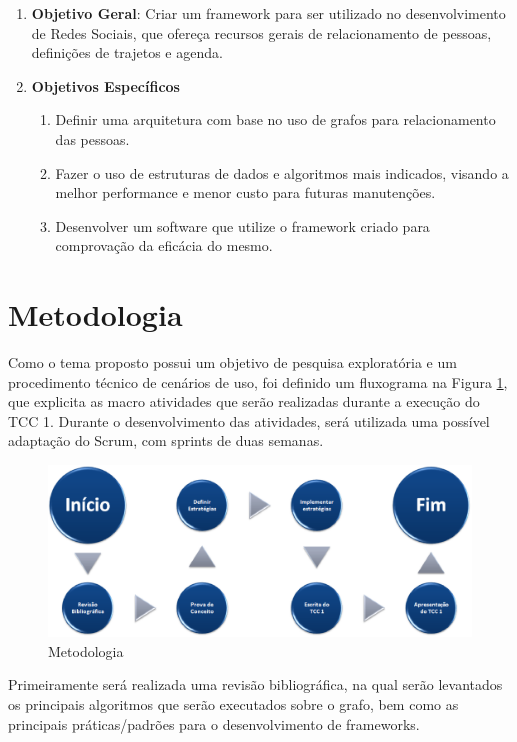 \begin{enumerate}
	\item \textbf{Objetivo Geral}: Criar um framework para ser utilizado no desenvolvimento de Redes Sociais, que ofereça recursos gerais de relacionamento de pessoas, definições de trajetos e agenda.

	\item \textbf{Objetivos Específicos}
	\begin{enumerate}
		\item Definir uma arquitetura com base no uso de grafos para relacionamento das pessoas.
		\item Fazer o uso de estruturas de dados e algoritmos mais indicados, visando a melhor performance e menor custo para futuras manutenções.
		\item Desenvolver um software que utilize o framework criado para comprovação da eficácia do mesmo.
	\end{enumerate}
\end{enumerate}

\newpage
\section*{Metodologia}

Como o tema proposto possui um objetivo de pesquisa exploratória e um procedimento técnico de cenários de uso, foi definido um fluxograma na Figura \ref{Metodologia}, que explicita as macro atividades que serão realizadas durante a execução do TCC 1.  Durante o desenvolvimento das atividades, será utilizada uma possível adaptação do Scrum, com sprints de duas semanas.

\begin{figure}[!h]
	\centering
	\includegraphics[scale=0.5]{figuras/metodologia.eps}
	\caption{Metodologia}
	\label{Metodologia}
\end{figure}

Primeiramente será realizada uma revisão bibliográfica, na qual serão levantados os principais algoritmos que serão executados sobre o grafo, bem como as principais práticas/padrões para o desenvolvimento de frameworks.

